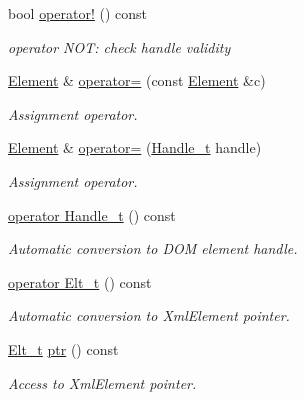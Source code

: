 \begin{DoxyCompactItemize}
bool \hyperlink{class_d_d4hep_1_1_x_m_l_1_1_element_a56049925440ca21e8f1fcb450cdd889f}{operator!} () const 
\begin{DoxyCompactList}\small\item\em operator NOT: check handle validity \item\end{DoxyCompactList}\item 
\hyperlink{class_d_d4hep_1_1_x_m_l_1_1_element}{Element} \& \hyperlink{class_d_d4hep_1_1_x_m_l_1_1_element_afa8ba01485168c3492bd913c22bc8c0d}{operator=} (const \hyperlink{class_d_d4hep_1_1_x_m_l_1_1_element}{Element} \&c)
\begin{DoxyCompactList}\small\item\em Assignment operator. \item\end{DoxyCompactList}\item 
\hyperlink{class_d_d4hep_1_1_x_m_l_1_1_element}{Element} \& \hyperlink{class_d_d4hep_1_1_x_m_l_1_1_element_a223f10555b456157ff26eb457a9e40e5}{operator=} (\hyperlink{class_d_d4hep_1_1_x_m_l_1_1_handle__t}{Handle\_\-t} handle)
\begin{DoxyCompactList}\small\item\em Assignment operator. \item\end{DoxyCompactList}\item 
\hyperlink{class_d_d4hep_1_1_x_m_l_1_1_element_a5405403ccb2937db7dfbaed08cc33880}{operator Handle\_\-t} () const 
\begin{DoxyCompactList}\small\item\em Automatic conversion to DOM element handle. \item\end{DoxyCompactList}\item 
\hyperlink{class_d_d4hep_1_1_x_m_l_1_1_element_abbb79834a9c68a8dbe88e496b7af8d0e}{operator Elt\_\-t} () const 
\begin{DoxyCompactList}\small\item\em Automatic conversion to XmlElement pointer. \item\end{DoxyCompactList}\item 
\hyperlink{class_d_d4hep_1_1_x_m_l_1_1_element_af63782f6873c3d8c9b28e1777cde9275}{Elt\_\-t} \hyperlink{class_d_d4hep_1_1_x_m_l_1_1_element_ac9a29b81894acb1480d098d33b2b820f}{ptr} () const 
\begin{DoxyCompactList}\small\item\em Access to XmlElement pointer. \item\end{DoxyCompactList}\item 

\end{DoxyCompactItemize}
